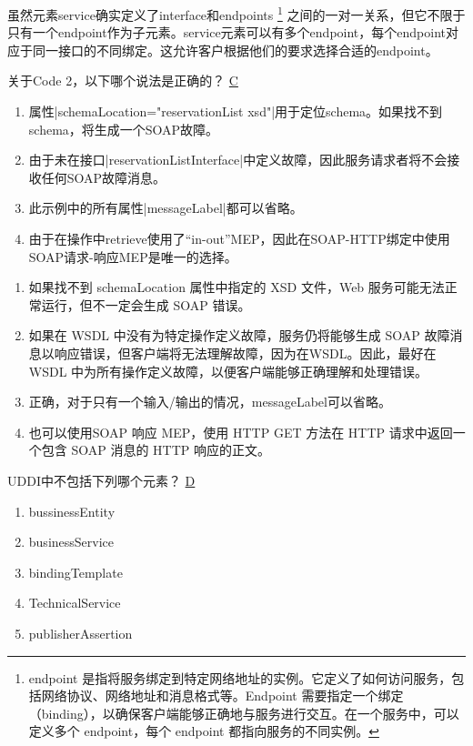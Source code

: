 \begin{solution}
虽然元素service确实定义了interface和endpoints
\footnote{endpoint 是指将服务绑定到特定网络地址的实例。它定义了如何访问服务，包括网络协议、网络地址和消息格式等。Endpoint 需要指定一个绑定（binding），以确保客户端能够正确地与服务进行交互。在一个服务中，可以定义多个 endpoint，每个 endpoint 都指向服务的不同实例。}
之间的一对一关系，但它不限于只有一个endpoint作为子元素。service元素可以有多个endpoint，每个endpoint对应于同一接口的不同绑定。这允许客户根据他们的要求选择合适的endpoint。
\end{solution}


\begin{problem}
关于Code 2，以下哪个说法是正确的？
\uline{C}
    \begin{enumerate}[label=\Alph*.]
        \item 属性\sverb|schemaLocation="reservationList xsd"|用于定位schema。如果找不到schema，将生成一个SOAP故障。
        \item 由于未在接口\sverb|reservationListInterface|\;中定义故障，因此服务请求者将不会接收任何SOAP故障消息。
        \item 此示例中的所有属性\sverb|messageLabel|\;都可以省略。
        \item 由于在操作中retrieve使用了“in-out”MEP，因此在SOAP-HTTP绑定中使用SOAP请求-响应MEP是唯一的选择。
    \end{enumerate}
\end{problem}

\begin{solution}
    \begin{enumerate}[label=\Alph*.]
        \item 如果找不到 schemaLocation 属性中指定的 XSD 文件，Web 服务可能无法正常运行，但不一定会生成 SOAP 错误。
        \item 如果在 WSDL 中没有为特定操作定义故障，服务仍将能够生成 SOAP 故障消息以响应错误，但客户端将无法理解故障，因为在WSDL。因此，最好在 WSDL 中为所有操作定义故障，以便客户端能够正确理解和处理错误。
        \item 正确，对于只有一个输入/输出的情况，messageLabel可以省略。
        \item 也可以使用SOAP 响应 MEP，使用 HTTP GET 方法在 HTTP 请求中返回一个包含 SOAP 消息的 HTTP 响应的正文。
    \end{enumerate}
\end{solution}


\begin{problem}
UDDI中不包括下列哪个元素？
\uline{D}
\vspace{-0.8em}
\begin{multicols}{3}
    \begin{enumerate}[label=\Alph*.]
        \item bussinessEntity
        \item businessService
        \item bindingTemplate
        \item TechnicalService
        \item publisherAssertion
    \end{enumerate}
\end{multicols}
\vspace{-1em}
\end{problem}


